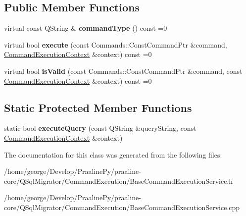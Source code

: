 \subsection*{Public Member Functions}
\begin{DoxyCompactItemize}
\item 
\mbox{\label{class_q_sql_migrator_1_1_command_execution_1_1_base_command_execution_service_ac2ed59b8b704834c65dcf7bb84cc684f}} 
virtual const Q\+String \& {\bfseries command\+Type} () const =0
\item 
\mbox{\label{class_q_sql_migrator_1_1_command_execution_1_1_base_command_execution_service_a294a781becad841fd56f8d92a6d540c1}} 
virtual bool {\bfseries execute} (const Commands\+::\+Const\+Command\+Ptr \&command, \hyperlink{class_q_sql_migrator_1_1_command_execution_1_1_command_execution_context}{Command\+Execution\+Context} \&context) const =0
\item 
\mbox{\label{class_q_sql_migrator_1_1_command_execution_1_1_base_command_execution_service_a298c998f3df57ba9d9f22438db1ccade}} 
virtual bool {\bfseries is\+Valid} (const Commands\+::\+Const\+Command\+Ptr \&command, const \hyperlink{class_q_sql_migrator_1_1_command_execution_1_1_command_execution_context}{Command\+Execution\+Context} \&context) const =0
\end{DoxyCompactItemize}
\subsection*{Static Protected Member Functions}
\begin{DoxyCompactItemize}
\item 
\mbox{\label{class_q_sql_migrator_1_1_command_execution_1_1_base_command_execution_service_ab02914d7a5e928634ab9071fdce96484}} 
static bool {\bfseries execute\+Query} (const Q\+String \&query\+String, const \hyperlink{class_q_sql_migrator_1_1_command_execution_1_1_command_execution_context}{Command\+Execution\+Context} \&context)
\end{DoxyCompactItemize}


The documentation for this class was generated from the following files\+:\begin{DoxyCompactItemize}
\item 
/home/george/\+Develop/\+Praaline\+Py/praaline-\/core/\+Q\+Sql\+Migrator/\+Command\+Execution/Base\+Command\+Execution\+Service.\+h\item 
/home/george/\+Develop/\+Praaline\+Py/praaline-\/core/\+Q\+Sql\+Migrator/\+Command\+Execution/Base\+Command\+Execution\+Service.\+cpp\end{DoxyCompactItemize}

